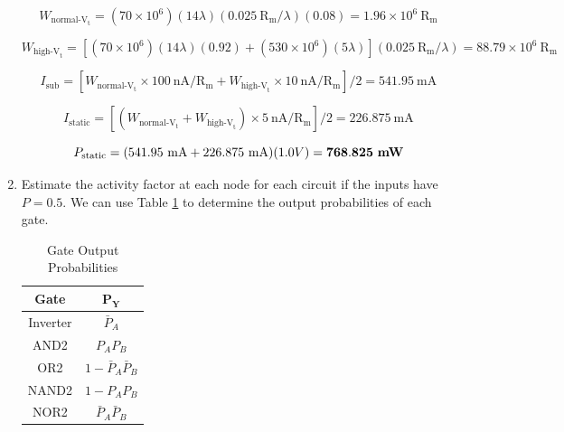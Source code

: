\documentclass[fleqn]{article}
\begin{document}
\begin{enumerate}
		\begin{equation*}
			W_{\text{normal-V}_\text{t}} = (70 \times 10^6)(14\lambda)(0.025\ \text{R}_\text{m}/\lambda)(0.08) = 1.96 \times 10^6\ \text{R}_\text{m}
		\end{equation*}
		
		\begin{equation*}
			W_{\text{high-V}_\text{t}} = \left[(70 \times 10^6)(14\lambda)(0.92) + (530 \times 10^6)(5\lambda)\right](0.025\ \text{R}_\text{m}/\lambda) = 88.79 \times 10^6\ \text{R}_\text{m}
		\end{equation*}
		
		\begin{equation*}
			I_\text{sub} = \left[W_{\text{normal-V}_\text{t}} \times 100\ \text{nA}/\text{R}_\text{m} + W_{\text{high-V}_\text{t}} \times 10\ \text{nA}/\text{R}_\text{m}\right]/2 = 541.95\ \text{mA}
		\end{equation*}			
			
		\begin{equation*}
			I_\text{static} = \left[(W_{\text{normal-V}_\text{t}} + W_{\text{high-V}_\text{t}}) \times 5\ \text{nA}/\text{R}_\text{m}\right]/2 = 226.875\ \text{mA}
		\end{equation*}	
		
		\begin{equation*}
			P_\text{static} = (541.95\ \text{mA} + 226.875\ \text{mA})(1.0 V) = \mathbf{768.825}\ \text{\textbf{mW}}
		\end{equation*}	
		
		\item Estimate the activity factor at each node for each circuit if the inputs have $P = 0.5$. We can use Table \ref{table::gate_out_prob} to determine the output probabilities of each gate.
		
		\vspace{-24pt}	
		\begin{table}[H]
		\begin{center}
		\caption{Gate Output Probabilities}
		\label{table::gate_out_prob}
		{
		\renewcommand{\arraystretch}{1.2}	
		\begin{tabular}{| c | c |}
			\hline
			\textbf{Gate} & $\mathbf{P_Y}$\\
			\hline	
			Inverter & $\bar{P}_A$\\
			\hline	
			AND2 & $P_AP_B$\\
			\hline	
			OR2 & $1 - \bar{P}_A\bar{P}_B$\\
			\hline	
			NAND2 & $1 - P_AP_B$\\
			\hline	
			NOR2 & $\bar{P}_A\bar{P}_B$\\
			\hline
		\end{tabular}
		}
		\end{center}
		\end{table}
		\vspace{-24pt}	
		

\end{enumerate}
\end{document}
